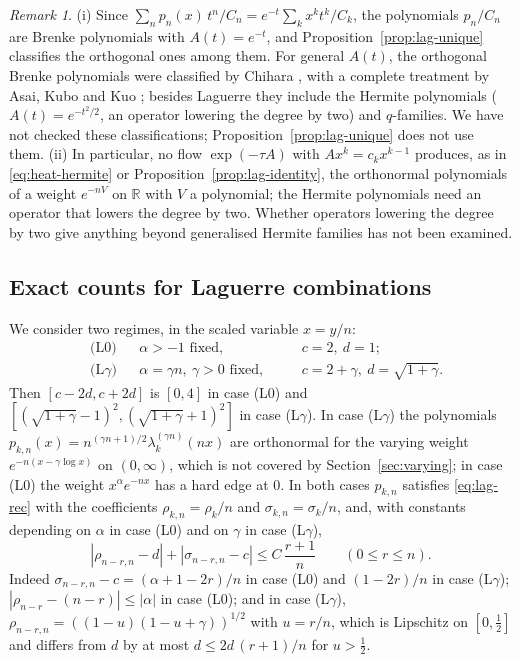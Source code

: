 \documentclass[11pt]{amsart}
\theoremstyle{definition}
\theoremstyle{remark}
\newtheorem{remark}[theorem]{Remark}
\numberwithin{equation}{section}
\newcommand{\R}{\mathbb{R}}
\begin{document}
\begin{remark}\label{rem:lag-brenke}
(i) Since $\sum_np_n(x)\,t^n/C_n=e^{-t}\sum_kx^kt^k/C_k$, the polynomials $p_n/C_n$ are Brenke polynomials with $A(t)=e^{-t}$, and Proposition~\ref{prop:lag-unique} classifies the orthogonal ones among them. For general $A(t)$, the orthogonal Brenke polynomials were classified by Chihara \cite{Ch68,Ch71}, with a complete treatment by Asai, Kubo and Kuo \cite{AKK}; besides Laguerre they include the Hermite polynomials ($A(t)=e^{-t^2/2}$, an operator lowering the degree by two) and $q$-families. We have not checked these classifications; Proposition~\ref{prop:lag-unique} does not use them. (ii) In particular, no flow $\exp(-\tau A)$ with $Ax^k=c_kx^{k-1}$ produces, as in \eqref{eq:heat-hermite} or Proposition~\ref{prop:lag-identity}, the orthonormal polynomials of a weight $e^{-nV}$ on $\R$ with $V$ a polynomial; the Hermite polynomials need an operator that lowers the degree by two. Whether operators lowering the degree by two give anything beyond generalised Hermite families has not been examined.
\end{remark}

\subsection{Exact counts for Laguerre combinations}\label{subsec:lag-count}
We consider two regimes, in the scaled variable $x=y/n$:
\begin{equation}\label{eq:lag-cases}
\begin{aligned}
&\text{(L0)}&&\alpha>-1\text{ fixed}, &&c=2,\ d=1;\\
&\text{(L}\gamma\text{)}&&\alpha=\gamma n,\ \gamma>0\text{ fixed},\quad &&c=2+\gamma,\ d=\sqrt{1+\gamma}.
\end{aligned}
\end{equation}
Then $[c-2d,c+2d]$ is $[0,4]$ in case (L0) and $[(\sqrt{1+\gamma}-1)^2,(\sqrt{1+\gamma}+1)^2]$ in case (L$\gamma$).
In case (L$\gamma$) the polynomials $p_{k,n}(x)=n^{(\gamma n+1)/2}\lambda^{(\gamma n)}_k(nx)$ are orthonormal for the varying weight $e^{-n(x-\gamma\log x)}$ on $(0,\infty)$, which is not covered by Section~\ref{sec:varying}; in case (L0) the weight $x^\alpha e^{-nx}$ has a hard edge at $0$. In both cases $p_{k,n}$ satisfies \eqref{eq:lag-rec} with the coefficients $\rho_{k,n}=\rho_k/n$ and $\sigma_{k,n}=\sigma_k/n$, and, with constants depending on $\alpha$ in case (L0) and on $\gamma$ in case (L$\gamma$),
\begin{equation}\label{eq:lag-rc}
|\rho_{n-r,n}-d|+|\sigma_{n-r,n}-c|\le C\,\frac{r+1}n\qquad(0\le r\le n).
\end{equation}
Indeed $\sigma_{n-r,n}-c=(\alpha+1-2r)/n$ in case (L0) and $(1-2r)/n$ in case (L$\gamma$); $|\rho_{n-r}-(n-r)|\le|\alpha|$ in case (L0); and in case (L$\gamma$), $\rho_{n-r,n}=((1-u)(1-u+\gamma))^{1/2}$ with $u=r/n$, which is Lipschitz on $[0,\frac12]$ and differs from $d$ by at most $d\le2d\,(r+1)/n$ for $u>\frac12$.
\end{document}
